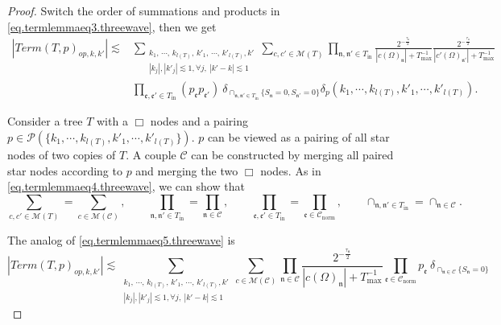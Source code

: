 \begin{proof}
Switch the order of summations and products in \eqref{eq.termlemmaeq3.threewave}, then we get
\begin{equation}\label{eq.termlemmaeq2op.threewave}
\begin{split}
    |Term(T, p)_{op,k,k'}|\lesssim& \sum_{\substack{k_1,\, \cdots,\, k_{l(T)},\, k'_1,\, \cdots,\, k'_{l(T)}, k'\\ |k_{j}|, |k'_j|\lesssim 1, \forall j,\ |k'-k|\lesssim 1}} \sum_{c, c'\in \mathscr{M}(T) }\prod_{\mathfrak{n}, \mathfrak{n}'\in T_{\text{in}}}\frac{2^{-\frac{\tau_{\mathfrak{n}}}{2}}}{|c(\Omega)_{\mathfrak{n}}|+T^{-1}_{\text{max}}}\frac{2^{-\frac{\tau_{\mathfrak{n}}}{2}}}{|c'(\Omega)_{\mathfrak{n}'}|+T^{-1}_{\text{max}}}
    \\
    & \prod_{\mathfrak{e},\mathfrak{e}'\in T_{\text{in}}} (p_{\mathfrak{e}}p_{\mathfrak{e}'})\ \delta_{\cap_{\mathfrak{n},\mathfrak{n}'\in T_{\text{in}}} \{S_{\mathfrak{n}}=0, S_{\mathfrak{n}'}=0\}} \delta_{p}(k_1,\cdots, k_{l(T)}, k'_1,\cdots, k'_{l(T)}).
\end{split}
\end{equation}

Consider a tree $T$ with a $\Box$ nodes and a pairing $p\in \mathcal{P}(\{k_1,\cdots, k_{l(T)}, k'_1,\cdots, k'_{l(T)}\})$. $p$ can be viewed as a pairing of all star nodes of two copies of $T$. A couple $\mathcal{C}$ can be constructed by merging all paired star nodes according to $p$ and merging the two $\Box$ nodes. As in \eqref{eq.termlemmaeq4.threewave}, we can show that
\begin{equation}\label{eq.termlemmaeq4op'.threewave}
\sum_{c, c'\in \mathscr{M}(T) }=\sum_{c\in \mathscr{M}(\mathcal{C}) },\qquad \prod_{\mathfrak{n}, \mathfrak{n}'\in T_{\text{in}}}=\prod_{\mathfrak{n}\in \mathcal{C}}, \qquad \prod_{\mathfrak{e},\mathfrak{e}'\in T_{\text{in}}}=\prod_{\mathfrak{e}\in \mathcal{C}_{\text{norm}}},\qquad \cap_{\mathfrak{n},\mathfrak{n}'\in T_{\text{in}}}=\cap_{\mathfrak{n}\in \mathcal{C}}.    
\end{equation}


The analog of \eqref{eq.termlemmaeq5.threewave} is 
\begin{equation}\label{eq.termlemmaeq5op.threewave}
|Term(T, p)_{op,k,k'}|\lesssim \sum_{\substack{k_1,\, \cdots,\, k_{l(T)},\, k'_1,\, \cdots,\, k'_{l(T)}, k'\\ |k_{j}|, |k'_j|\lesssim 1, \forall j,\ |k'-k|\lesssim 1}} \sum_{c\in \mathscr{M}(\mathcal{C}) }\prod_{\mathfrak{n}\in \mathcal{C}}\frac{2^{-\frac{\tau_{\mathfrak{n}}}{2}}}{|c(\Omega)_{\mathfrak{n}}|+T^{-1}_{\text{max}}} \prod_{\mathfrak{e}\in \mathcal{C}_{\text{norm}}} p_{\mathfrak{e}}\  \delta_{\cap_{\mathfrak{n}\in \mathcal{C}} \{S_{\mathfrak{n}}=0\}}
\end{equation}


\end{proof}
